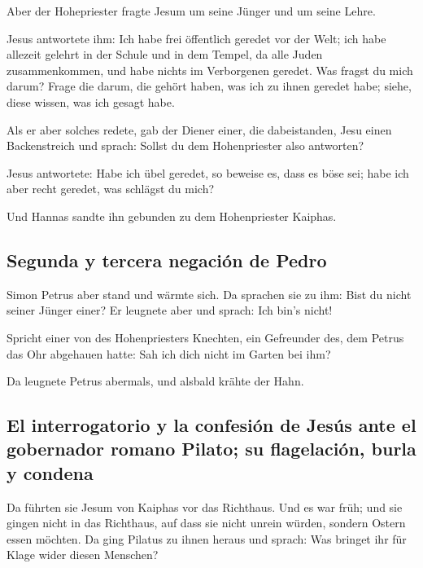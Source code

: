  Aber der Hohepriester fragte Jesum um seine Jünger und
um seine Lehre.

 Jesus antwortete ihm: Ich habe frei öffentlich geredet
vor der Welt; ich habe allezeit gelehrt in der Schule und in dem Tempel,
da alle Juden zusammenkommen, und habe nichts im Verborgenen geredet.
 Was fragst du mich darum? Frage die darum, die gehört
haben, was ich zu ihnen geredet habe; siehe, diese wissen, was ich
gesagt habe.

 Als er aber solches redete, gab der Diener einer, die
dabeistanden, Jesu einen Backenstreich und sprach: Sollst du dem
Hohenpriester also antworten?

 Jesus antwortete: Habe ich übel geredet, so beweise es,
dass es böse sei; habe ich aber recht geredet, was schlägst du mich?

 Und Hannas sandte ihn gebunden zu dem Hohenpriester
Kaiphas.

\hypertarget{segunda-y-tercera-negaciuxf3n-de-pedro}{%
\subsection{Segunda y tercera negación de
Pedro}\label{segunda-y-tercera-negaciuxf3n-de-pedro}}

 Simon Petrus aber stand und wärmte sich. Da sprachen sie
zu ihm: Bist du nicht seiner Jünger einer? Er leugnete aber und sprach:
Ich bin's nicht!

 Spricht einer von des Hohenpriesters Knechten, ein
Gefreunder des, dem Petrus das Ohr abgehauen hatte: Sah ich dich nicht
im Garten bei ihm?

 Da leugnete Petrus abermals, und alsbald krähte der
Hahn.

\hypertarget{el-interrogatorio-y-la-confesiuxf3n-de-jesuxfas-ante-el-gobernador-romano-pilato-su-flagelaciuxf3n-burla-y-condena}{%
\subsection{El interrogatorio y la confesión de Jesús ante el gobernador
romano Pilato; su flagelación, burla y
condena}\label{el-interrogatorio-y-la-confesiuxf3n-de-jesuxfas-ante-el-gobernador-romano-pilato-su-flagelaciuxf3n-burla-y-condena}}

 Da führten sie Jesum von Kaiphas vor das Richthaus. Und
es war früh; und sie gingen nicht in das Richthaus, auf dass sie nicht
unrein würden, sondern Ostern essen möchten.  Da ging
Pilatus zu ihnen heraus und sprach: Was bringet ihr für Klage wider
diesen Menschen?

